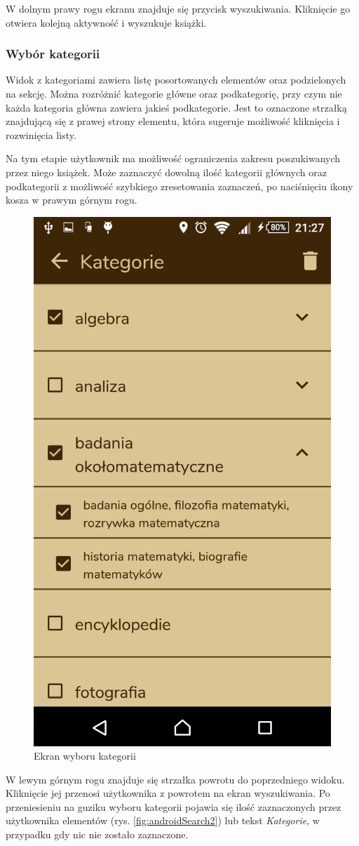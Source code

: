 \documentclass[twoside]{projektInzynierskiMS}
\begin{document}
W dolnym prawy rogu ekranu znajduje się przycisk wyszukiwania. Kliknięcie go otwiera kolejną aktywność i wyszukuje książki.

\subsubsection{Wybór kategorii}

Widok z kategoriami zawiera listę posortowanych elementów oraz podzielonych na sekcję. Można rozróżnić kategorie główne oraz podkategorię, przy czym nie każda kategoria główna zawiera jakieś podkategorie. Jest to oznaczone strzałką znajdującą się z prawej strony elementu, która sugeruje możliwość kliknięcia i rozwinięcia listy. 

Na tym etapie użytkownik ma możliwość ograniczenia zakresu poszukiwanych przez niego książek. Może zaznaczyć dowolną ilość kategorii głównych oraz podkategorii z możliwość szybkiego zresetowania zaznaczeń, po naciśnięciu ikony kosza w prawym górnym rogu. 

\begin{figure}[h]
  \centering
  \includegraphics[width=0.4\linewidth]{img/android/android4.png}
  \caption{Ekran wyboru kategorii}
  \label{fig:androidCategoriesScreen}
\end{figure}

W lewym górnym rogu znajduje się strzałka powrotu do poprzedniego widoku. Kliknięcie jej przenosi użytkownika z powrotem na ekran wyszukiwania. Po przeniesieniu na guziku wyboru kategorii pojawia się ilość zaznaczonych przez użytkownika elementów (rys. \ref{fig:androidSearch2}) lub tekst \textit{Kategorie}, w przypadku gdy nic nie zostało zaznaczone.
\end{document}
